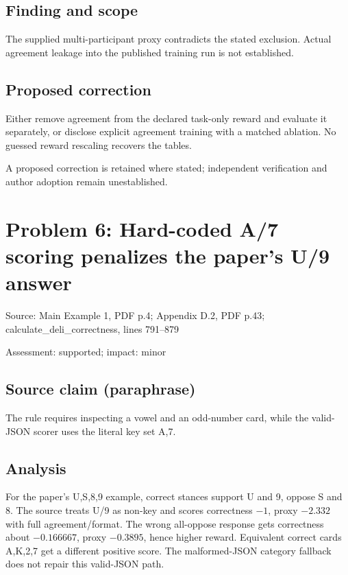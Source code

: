 \documentclass[11pt]{article}
\begin{document}
\subsection*{Finding and scope}

The supplied multi-participant proxy contradicts the stated exclusion. Actual agreement leakage into the published training run is not established.

\subsection*{Proposed correction}

Either remove agreement from the declared task-only reward and evaluate it separately, or disclose explicit agreement training with a matched ablation. No guessed reward rescaling recovers the tables.

A proposed correction is retained where stated; independent verification and author adoption remain unestablished.

\section*{Problem 6: Hard-coded A/7 scoring penalizes the paper’s U/9 answer}

Source: Main Example 1, PDF p.4; Appendix D.2, PDF p.43; calculate\_deli\_correctness, lines 791–879

Assessment: supported; impact: minor

\subsection*{Source claim (paraphrase)}

The rule requires inspecting a vowel and an odd-number card, while the valid-JSON scorer uses the literal key set A,7.

\subsection*{Analysis}

For the paper’s U,S,8,9 example, correct stances support U and 9, oppose S and 8. The source treats U/9 as non-key and scores correctness \(-1\), proxy \(-2.332\) with full agreement/format. The wrong all-oppose response gets correctness about \(-0.166667\), proxy \(-0.3895\), hence higher reward. Equivalent correct cards A,K,2,7 get a different positive score. The malformed-JSON category fallback does not repair this valid-JSON path.
\end{document}
